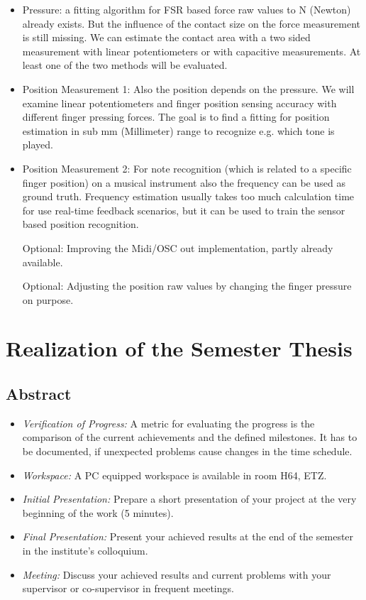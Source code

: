 \begin{itemize}
\item  Pressure: a fitting algorithm for FSR based force raw values to N (Newton) already exists. But the influence of the contact size on the force measurement is still missing. We can estimate the contact area with a two sided measurement with linear potentiometers or with capacitive measurements. At least one of the two methods will be evaluated. 

\item  Position Measurement 1: Also the position depends on the pressure. We will examine linear potentiometers and finger position sensing accuracy with different  finger pressing forces. The goal is to find a fitting for position estimation in sub mm (Millimeter) range to recognize e.g. which tone is played. 

\item  Position Measurement 2: For note recognition (which is related to a specific finger position) on a musical instrument also the frequency can be used as ground truth. Frequency estimation usually takes too much calculation time for use real-time feedback scenarios, but it can be used to train the sensor based position recognition.  

\item [Optional:] Improving the Midi/OSC out implementation, partly already available. 

\item [Optional:] Adjusting the position raw values by changing the finger pressure on purpose. 

\end{itemize}



\section*{Realization of the Semester Thesis}

\subsection*{Abstract}
\begin{itemize}
\item
   \emph{Verification of Progress:} A metric for evaluating the progress is the comparison of the current achievements and the defined milestones. It has to be documented, if unexpected problems cause changes in the time schedule.
  \item
   \emph{Workspace:} A PC equipped workspace is available in room H64, ETZ. 
     \item
   \emph{Initial Presentation:} Prepare a short presentation of your project at the very beginning of the work (5 minutes). 
  \item
   \emph{Final Presentation:} Present your achieved results at the end of the semester in the institute's colloquium.
  \item
   \emph{Meeting:} Discuss your achieved results and current problems with your supervisor or co-supervisor in frequent meetings.
 \end{itemize}
 
